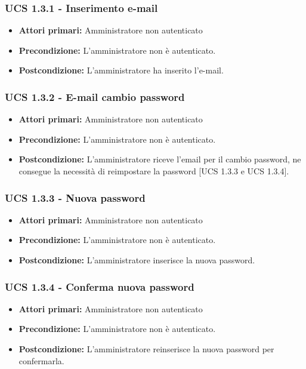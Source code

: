 \subsubsection{UCS 1.3.1 - Inserimento e-mail}
\begin{itemize}
\item \textbf{Attori primari:} Amministratore non autenticato
\item \textbf{Precondizione:} L'amministratore non è autenticato. %
\item \textbf{Postcondizione:} L'amministratore ha inserito l'e-mail.
\end{itemize}

\subsubsection{UCS 1.3.2 - E-mail cambio password}
\begin{itemize}
\item \textbf{Attori primari:} Amministratore non autenticato
\item \textbf{Precondizione:} L'amministratore non è autenticato.
\item \textbf{Postcondizione:} L'amministratore riceve l'email per il cambio password, ne consegue la necessità di reimpostare la password [UCS 1.3.3 e UCS 1.3.4].
\end{itemize}

\subsubsection{UCS 1.3.3 - Nuova password}
\begin{itemize}
\item \textbf{Attori primari:} Amministratore non autenticato
\item \textbf{Precondizione:}  L'amministratore non è autenticato.
\item \textbf{Postcondizione:} L'amministratore inserisce la nuova password.
\end{itemize}

\subsubsection{UCS 1.3.4 - Conferma nuova password}
\begin{itemize}
\item \textbf{Attori primari:} Amministratore non autenticato
\item \textbf{Precondizione:} L'amministratore non è autenticato.
\item \textbf{Postcondizione:} L'amministratore reinserisce la nuova password per confermarla.
\end{itemize}

